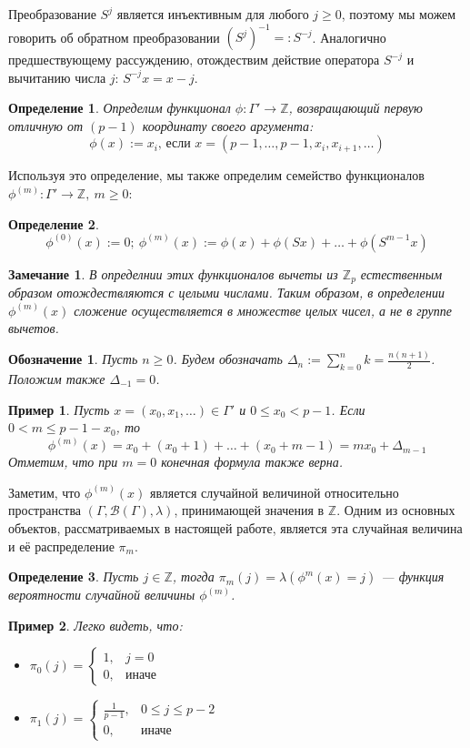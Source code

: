 \documentclass[14pt, a4paper, russian]{report}
\newtheorem{remark}{\indent Замечание}
\newtheorem{definition}{\indent Определение}
\newtheorem{example}{\indent Пример}
\newtheorem{notation}{\indent Обозначение}
\begin{document}
Преобразование $S^j$ является инъективным для любого $j \ge 0$, поэтому мы можем говорить об обратном преобразовании $(S^j)^{-1} =: S^{-j}$. Аналогично предшествующему рассуждению, отождествим действие оператора $S^{-j}$ и вычитанию числа $j$: $S^{-j} x = x - j$.

\begin{definition}\label{phi}
Определим функционал $\phi: \Gamma' \to \mathbb{Z}$, возвращающий первую отличную от $(p-1)$ координату своего аргумента:
 \[\phi(x):=x_i\text{, если }x=(p-1, \ldots, p-1, x_i, x_{i+1}, \ldots)\]
\end{definition}
 Используя это определение, мы также определим семейство функционалов $\phi^{(m)}: \Gamma' \to \mathbb{Z},\ m \ge 0$:
\begin{definition}\label{phi_m}
    \[\phi^{(0)}(x):=0;\ \phi^{(m)}(x):=\phi(x)+\phi(Sx)+\ldots+\phi(S^{m-1}x)\]
\end{definition}
\begin{remark}
В определнии этих функционалов вычеты из $\mathbb{Z}_p$ естественным образом отождествляются с целыми числами. Таким образом, в определении $\phi^{(m)}(x)$ сложение осуществляется в множестве целых чисел, а не в группе вычетов.
\end{remark}

\begin{notation}
Пусть $n \ge 0$. Будем обозначать $\Delta_n := \sum\limits_{k=0}^{n}k = \frac{n(n+1)}{2}$. Положим также $\Delta_{-1} = 0$.
\end{notation}

\begin{example}\label{phi_delta}
Пусть $x = (x_0, x_1, \ldots) \in \Gamma'$ и $0 \le x_0 < p-1$. Если $0 < m \le p-1-x_0$, то $$\phi^{(m)}(x) = x_0 + (x_0 + 1) + \ldots + (x_0 + m - 1) = mx_0 + \Delta_{m-1}$$
Отметим, что при $m=0$ конечная формула также верна.
\end{example}

Заметим, что $\phi^{(m)}(x)$ является случайной величиной относительно пространства $(\Gamma, \mathcal{B}(\Gamma), \lambda)$, принимающей значения в $\mathbb{Z}$. Одним из основных объектов, рассматриваемых в настоящей работе, является эта случайная величина и её распределение $\pi_m$.
\begin{definition}\label{pi_m}
Пусть $j \in \mathbb{Z}$, тогда $\pi_m(j)=\lambda(\phi^{m}(x)=j)$ --- функция вероятности случайной величины $\phi^{(m)}$.
\end{definition}
\begin{example}\label{pi_example}
Легко видеть, что:
\begin{itemize}
\item $\pi_0(j) = \begin{cases}
1, & j = 0\\
0, & \text{иначе}
\end{cases}$
\item $\pi_1(j)=\begin{cases}
\frac{1}{p-1},& 0 \le j \le p-2 \\
0, & \text{иначе}
\end{cases}$
\end{itemize} 
\end{example}
\end{document}
